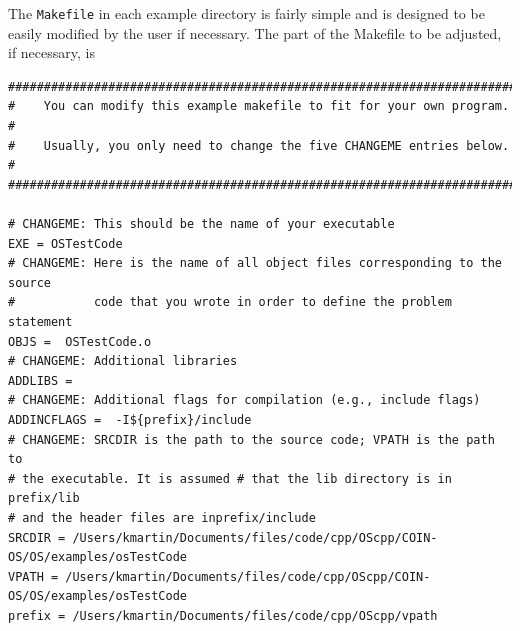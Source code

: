 \documentclass[11pt]{article}
\renewcommand{\_}{{\char"5F}}
\renewcommand{\{}{{\char"7B}}
\renewcommand{\}}{{\char"7D}}
\renewcommand{\^}{{\char"0D}}
\renewcommand{\'}{{\char"0D}}
\begin{document}
\begin{enumerate}[Step 1:]
The {\tt Makefile} in each example directory is fairly simple and is designed to be easily modified by the user
if necessary.  The part of the Makefile to be adjusted, if necessary, is
%

\begin{verbatim}
##########################################################################
#    You can modify this example makefile to fit for your own program.   #
#    Usually, you only need to change the five CHANGEME entries below.   #
##########################################################################

# CHANGEME: This should be the name of your executable
EXE = OSTestCode
# CHANGEME: Here is the name of all object files corresponding to the source
#           code that you wrote in order to define the problem statement
OBJS =  OSTestCode.o
# CHANGEME: Additional libraries
ADDLIBS =
# CHANGEME: Additional flags for compilation (e.g., include flags)
ADDINCFLAGS =  -I${prefix}/include
# CHANGEME: SRCDIR is the path to the source code; VPATH is the path to
# the executable. It is assumed # that the lib directory is in prefix/lib
# and the header files are inprefix/include
SRCDIR = /Users/kmartin/Documents/files/code/cpp/OScpp/COIN-OS/OS/examples/osTestCode
VPATH = /Users/kmartin/Documents/files/code/cpp/OScpp/COIN-OS/OS/examples/osTestCode
prefix = /Users/kmartin/Documents/files/code/cpp/OScpp/vpath
\end{verbatim}



\end{enumerate}
\end{document}
